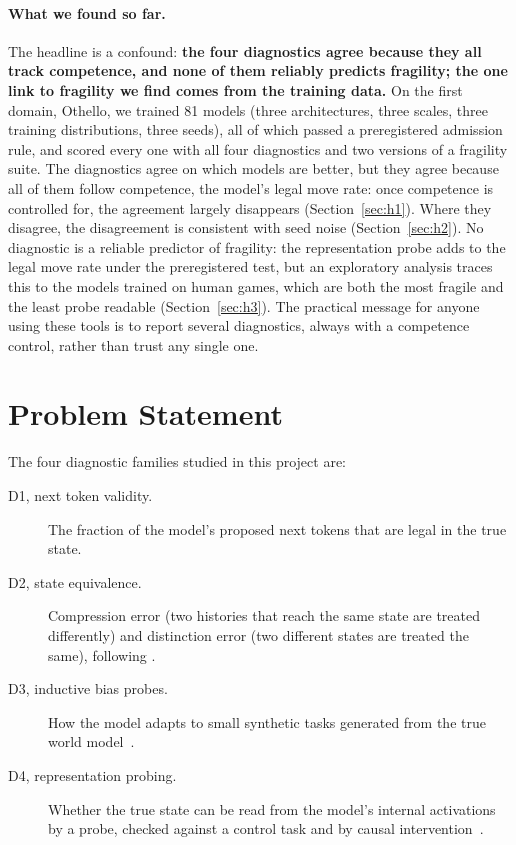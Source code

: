 \documentclass[11pt]{scrartcl}
\begin{document}
\paragraph{What we found so far.} The headline is a confound: \textbf{the four diagnostics agree because they
all track competence, and none of them reliably predicts fragility; the one link to fragility we find comes
from the training data.} On the first domain, Othello, we trained 81 models (three architectures,
three scales, three training distributions, three seeds), all of which passed a preregistered admission rule,
and scored every one with all four diagnostics and two versions of a fragility suite. The diagnostics agree on
which models are better, but they agree because all of them follow competence, the model's legal move rate:
once competence is controlled for, the agreement largely disappears (Section~\ref{sec:h1}). Where they
disagree, the disagreement is consistent with seed noise (Section~\ref{sec:h2}). No diagnostic is a reliable
predictor of fragility: the representation probe adds to the legal move rate under the preregistered test,
but an exploratory analysis traces this to the models trained on human games, which are both the most fragile
and the least probe readable (Section~\ref{sec:h3}). The practical message for anyone using these tools is to
report several diagnostics, always with a competence control, rather than trust any single one.

\section{Problem Statement}

The four diagnostic families studied in this project are:
\begin{description}
    \item[D1, next token validity.] The fraction of the model's proposed next tokens that are legal in the
    true state.
    \item[D2, state equivalence.] Compression error (two histories that reach the same state are treated
    differently) and distinction error (two different states are treated the same), following
    \cite{vafa2024evaluating}.
    \item[D3, inductive bias probes.] How the model adapts to small synthetic tasks generated from the true
    world model~\cite{vafa2025inductive}.
    \item[D4, representation probing.] Whether the true state can be read from the model's internal
    activations by a probe, checked against a control task and by causal intervention~\cite{li2023othello}.
\end{description}
\end{document}
